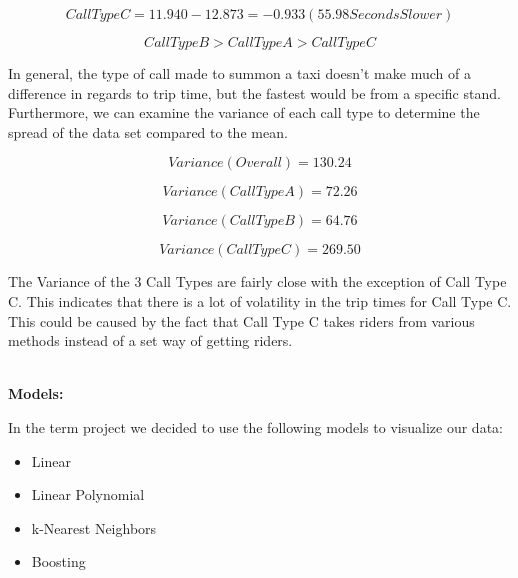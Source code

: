 \documentclass[11pt]{article}
\begin{document}
\begin{equation}
Call Type C = 11.940 - 12.873 = -0.933 (55.98 Seconds Slower)
\end{equation}

\begin{equation}
Call Type B >Call Type A > Call Type C
\end{equation}

\par
In general, the type of call made to summon a taxi doesn’t make much of a difference in regards to trip time, but the fastest would be from a specific stand. Furthermore, we can examine the variance of each call type to determine the spread of the data set compared to the mean.

\begin{equation}
Variance (Overall) = 130.24
\end{equation}

\begin{equation}
Variance (Call Type A) = 72.26
\end{equation}

\begin{equation}
Variance (Call Type B) = 64.76
\end{equation}

\begin{equation}
Variance (Call Type C) = 269.50
\end{equation}

\par
The Variance of the 3 Call Types are fairly close with the exception of Call Type C. This indicates that there is a lot of volatility in the trip times for Call Type C. This could be caused by the fact that Call Type C takes riders from various methods instead of a set way of getting riders.

\\
\textbf{Models:}
\par
In the term project we decided to use the following models to visualize our data:
\begin{itemize}
	\item Linear
	\item Linear Polynomial
	\item k-Nearest Neighbors
	\item Boosting
\end{itemize}
\end{document}
